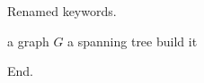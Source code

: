 \documentclass{article}
\begin{document}
Renamed keywords.

\begin{algorithm}[h]
\caption{Renames}
\begin{algorithmic}[1]
\Require a graph $G$
\Ensure a spanning tree
\State build it
\end{algorithmic}
\end{algorithm}

End.
\end{document}
